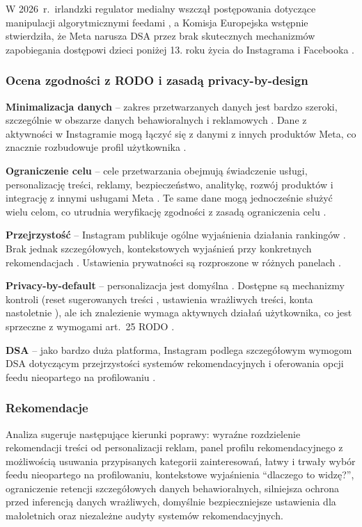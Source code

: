 \documentclass[12pt, a4paper]{article}
\begin{document}
W 2026~r.\ irlandzki regulator medialny wszczął postępowania dotyczące manipulacji algorytmicznymi feedami \cite{reuters_ie}, a Komisja Europejska wstępnie stwierdziła, że Meta narusza DSA przez brak skutecznych mechanizmów zapobiegania dostępowi dzieci poniżej 13. roku życia do Instagrama i Facebooka \cite{ec_meta_dsa}.

\subsubsection{Ocena zgodności z RODO i zasadą privacy-by-design}

\textbf{Minimalizacja danych} -- zakres przetwarzanych danych jest bardzo szeroki, szczególnie w obszarze danych behawioralnych i reklamowych \cite{meta_privacy}. Dane z aktywności w Instagramie mogą łączyć się z danymi z innych produktów Meta, co znacznie rozbudowuje profil użytkownika \cite{meta_privacy, himeur2022}.

\textbf{Ograniczenie celu} -- cele przetwarzania obejmują świadczenie usługi, personalizację treści, reklamy, bezpieczeństwo, analitykę, rozwój produktów i integrację z innymi usługami Meta \cite{meta_privacy}. Te same dane mogą jednocześnie służyć wielu celom, co utrudnia weryfikację zgodności z zasadą ograniczenia celu \cite{rodo, chen2025}.

\textbf{Przejrzystość} -- Instagram publikuje ogólne wyjaśnienia działania rankingów \cite{ig_ranking, ig_creators}. Brak jednak szczegółowych, kontekstowych wyjaśnień przy konkretnych rekomendacjach \cite{edpb2019}. Ustawienia prywatności są rozproszone w różnych panelach \cite{ig_recs}.

\textbf{Privacy-by-default} -- personalizacja jest domyślna \cite{ig_ranking}. Dostępne są mechanizmy kontroli (reset sugerowanych treści \cite{ig_reset}, ustawienia wrażliwych treści, konta nastoletnie \cite{meta_teen}), ale ich znalezienie wymaga aktywnych działań użytkownika, co jest sprzeczne z wymogami art.~25 RODO \cite{rodo, edpb2019}.

\textbf{DSA} -- jako bardzo duża platforma, Instagram podlega szczegółowym wymogom DSA dotyczącym przejrzystości systemów rekomendacyjnych i oferowania opcji feedu nieopartego na profilowaniu \cite{dsa, ec_dsa}.

\subsubsection{Rekomendacje}

Analiza sugeruje następujące kierunki poprawy: wyraźne rozdzielenie rekomendacji treści od personalizacji reklam, panel profilu rekomendacyjnego z możliwością usuwania przypisanych kategorii zainteresowań, łatwy i trwały wybór feedu nieopartego na profilowaniu, kontekstowe wyjaśnienia ``dlaczego to widzę?'', ograniczenie retencji szczegółowych danych behawioralnych, silniejsza ochrona przed inferencją danych wrażliwych, domyślnie bezpieczniejsze ustawienia dla małoletnich oraz niezależne audyty systemów rekomendacyjnych.
\end{document}
